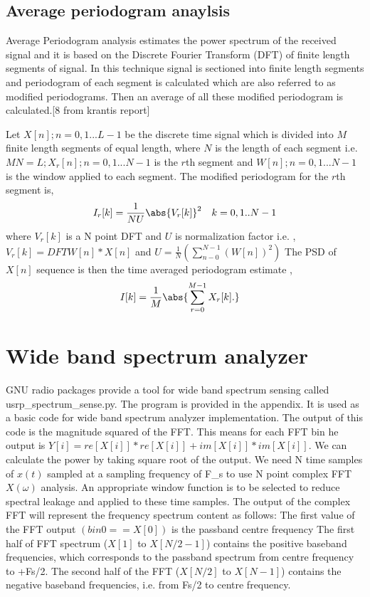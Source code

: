 \subsection{Average periodogram anaylsis}
Average Periodogram analysis estimates the power spectrum of the received signal
and it is based on the Discrete Fourier Transform (DFT) of finite length 
segments of signal. In this technique signal is sectioned into finite length 
segments and periodogram of each segment is calculated which are also referred 
to as modified periodograms. Then an average of all these modified periodogram 
is calculated.[8 from krantis report]

Let $X[n]; n = 0,1...L-1$ be the discrete time signal which is  divided into 
$M$ 
finite length segments of equal length, where $N$ is the length of each segment  
i.e. $MN = L; X_{r}[n]; n = 0,1...N-1$ is the $r$th segment and $W[n]; n = 0,1...N-1$ is 
the window applied to each segment. The modified periodogram for the $r$th segment
 is,
\begin{align}
    I_{r}[k] &= \frac{1}{NU}\abs{V_{r}[k]}^2     & k = 0,1..N-1 \nonumber
\end{align}
where $V_{r}[k]$ is a N point DFT and $U$ is normalization factor i.e. , 
$V_{r}[k] = DFT{W[n]*X[n]}$
and $U = \frac{1}{N}(\sum_{n-0}^{N-1} (W[n])^2)$
The PSD of $X[n]$ sequence is then the time averaged periodogram estimate ,
\begin{align}
    I[k] &= \frac{1}{M}\abs{\sum_{r=0}^{M-1}X_{r}[k].}\nonumber
\end{align}

\section{Wide band spectrum analyzer}

GNU radio packages provide a tool for wide band spectrum sensing 
called 
usrp\_spectrum\_sense.py. The program is provided in the appendix. 
It is used as
a basic code for wide band spectrum analyzer implementation. The output of this 
code is the magnitude squared of the FFT. This means for each FFT bin he output 
is $Y[i] = re[X[i]] *re[X[i]] + im[X[i]]*im[X[i]]$. We can calculate the power by
taking square root of the output. We need N time samples of $x(t)$ sampled at a 
sampling frequency of F_{s} to use N point complex FFT $X(\omega)$ analysis. An 
appropriate window function is to be selected to reduce spectral leakage and 
applied to these time samples. The output of the complex FFT will represent the 
frequency spectrum content as follows: The first value of the FFT output 
$(bin0 == X[0])$ is the passband centre frequency The first half of FFT spectrum 
($X[1]$ to $X[N/2-1]$) contains the positive baseband frequencies, which corresponds
to the passband spectrum from centre frequency to +Fs/2. The second half of the 
FFT ($X[N/2]$ to $X[N-1]$) contains the negative baseband frequencies, i.e. from 
Fs/2 to centre frequency.


